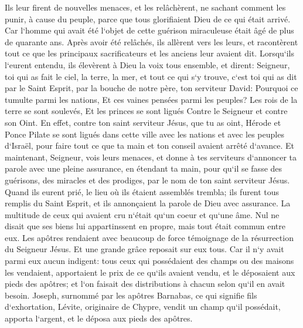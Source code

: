 \verse Ils leur firent de nouvelles menaces, et les relâchèrent, ne sachant comment les punir, à cause du peuple, parce que tous glorifiaient Dieu de ce qui était arrivé. 
\verse Car l`homme qui avait été l`objet de cette guérison miraculeuse était âgé de plus de quarante ans. 
\verse Après avoir été relâchés, ils allèrent vers les leurs, et racontèrent tout ce que les principaux sacrificateurs et les anciens leur avaient dit. 
\verse Lorsqu`ils l`eurent entendu, ils élevèrent à Dieu la voix tous ensemble, et dirent: Seigneur, toi qui as fait le ciel, la terre, la mer, et tout ce qui s`y trouve, 
\verse c`est toi qui as dit par le Saint Esprit, par la bouche de notre père, ton serviteur David: Pourquoi ce tumulte parmi les nations, Et ces vaines pensées parmi les peuples? 
\verse Les rois de la terre se sont soulevés, Et les princes se sont ligués Contre le Seigneur et contre son Oint. 
\verse En effet, contre ton saint serviteur Jésus, que tu as oint, Hérode et Ponce Pilate se sont ligués dans cette ville avec les nations et avec les peuples d`Israël, 
\verse pour faire tout ce que ta main et ton conseil avaient arrêté d`avance. 
\verse Et maintenant, Seigneur, vois leurs menaces, et donne à tes serviteurs d`annoncer ta parole avec une pleine assurance, 
\verse en étendant ta main, pour qu`il se fasse des guérisons, des miracles et des prodiges, par le nom de ton saint serviteur Jésus. 
\verse Quand ils eurent prié, le lieu où ils étaient assemblés trembla; ils furent tous remplis du Saint Esprit, et ils annonçaient la parole de Dieu avec assurance. 
\verse La multitude de ceux qui avaient cru n`était qu`un coeur et qu`une âme. Nul ne disait que ses biens lui appartinssent en propre, mais tout était commun entre eux. 
\verse Les apôtres rendaient avec beaucoup de force témoignage de la résurrection du Seigneur Jésus. Et une grande grâce reposait sur eux tous. 
\verse Car il n`y avait parmi eux aucun indigent: tous ceux qui possédaient des champs ou des maisons les vendaient, apportaient le prix de ce qu`ils avaient vendu, 
\verse et le déposaient aux pieds des apôtres; et l`on faisait des distributions à chacun selon qu`il en avait besoin. 
\verse Joseph, surnommé par les apôtres Barnabas, ce qui signifie fils d`exhortation, Lévite, originaire de Chypre, 
\verse vendit un champ qu`il possédait, apporta l`argent, et le déposa aux pieds des apôtres. 

\chapter{}

